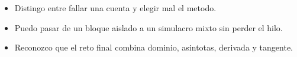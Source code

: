 \begin{selfcheck}
\begin{itemize}
  \item Distingo entre fallar una cuenta y elegir mal el metodo.
  \item Puedo pasar de un bloque aislado a un simulacro mixto sin perder el hilo.
  \item Reconozco que el reto final combina dominio, asintotas, derivada y tangente.
\end{itemize}
\end{selfcheck}

